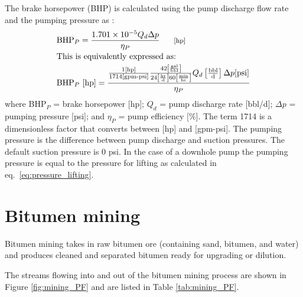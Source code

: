 \documentclass[11pt]{report}
\newcommand{\marg}[1]{{\footnotesize\textit{\textcolor{stanford}{'#1'}}}}
\newcommand{\marginnote}[1]{\marginpar{\marg{#1}}}
\begin{document}
The brake horsepower (BHP) is calculated using the pump discharge flow rate and the pumping pressure as \cite[p. 27]{Rose1989}: \marginnote{Production \& Extraction 2.2.3} 
\begin{equation} \label{eq:pump_BHP}
\begin{split}
&\text{BHP$_{P}$}=\frac{1.701 \times 10^{-5} Q_{d} \Delta p}{\eta_P} \begin{footnotesize} \quad\quad\text{[hp]} \end{footnotesize}\\
&\text{This is equivalently expressed as:}\\
&\text{BHP$_{P}$ [hp]}=\frac{\frac{1 [\text{hp}]}{1714 [\text{gpm-psi}]} \frac{42\left[\frac{\text{gal}}{\text{bbl}}\right]}{24\left[\frac{\text{hr}}{\text{d}}\right] 60\left[\frac{\text{min}}{\text{hr}}\right]} Q_{d} \left[\frac{\text{bbl}}{\text{d}}\right] \Delta p [\text{psi}]}{\eta_P} 
\end{split}
\end{equation}
where BHP$_{P}$ = brake horsepower [hp]; $Q_{d}$ = pump discharge rate [bbl/d]; \newline $\Delta p$ = pumping pressure [psi]; and $\eta_P$ = pump efficiency [\%]. The term 1714 is a dimensionless factor that converts between [hp] and [gpm-psi]. The pumping pressure is the difference between pump discharge and suction pressures. The default suction pressure is 0 psi. In the case of a downhole pump the pumping pressure is equal to the pressure for lifting as calculated in eq.\ \eqref{eq:pressure_lifting}. 


\clearpage

\section{Bitumen mining}
\label{sec:bitumen_mining}

Bitumen mining takes in raw bitumen ore (containing sand, bitumen, and water) and produces cleaned and separated bitumen ready for upgrading or dilution.

The streams flowing into and out of the bitumen mining process are shown in Figure \ref{fig:mining_PF} and are listed in Table \ref{tab:mining_PF}.


\clearpage
\end{document}
